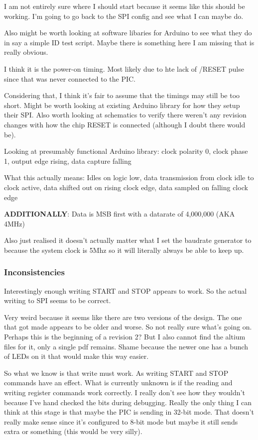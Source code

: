 I am not entirely sure where I should start because it seems like this should be working.
I'm going to go back to the SPI config and see what I can maybe do.

Also might be worth looking at software libaries for Arduino to see what they do in say
a simple ID test script.
Maybe there is something here I am missing that is really obvious.

I think it is the power-on timing. Most likely due to hte lack of /RESET pulse since
that was never connected to the PIC.

Considering that, I think it's fair to assume that the timings may still be too short.
Might be worth looking at existing Arduino library for how they setup their SPI.
Also worth looking at schematics to verify there weren't any revision changes with how
the chip RESET is connected (although I doubt there would be).

Looking at presumably functional Arduino library:
clock polarity 0, clock phase 1, output edge rising, data capture falling

What this actually means:
Idles on logic low, data transmission from clock idle to clock active,
data shifted out on rising clock edge, data sampled on falling clock edge

\textbf{ADDITIONALLY}: Data is MSB first with a datarate of 4,000,000 (AKA 4MHz)

Also just realised it doesn't actually matter what I set the baudrate generator to because
the system clock is 5Mhz so it will literally always be able to keep up.


\subsubsection{Inconsistencies}
Interestingly enough writing START and STOP appears to work.
So the actual writing to SPI seems to be correct.

Very weird because it seems like there are two versions of the design.
The one that got made appears to be older and worse. So not really sure what's going on.
Perhaps this is the beginning of a revision 2?
But I also cannot find the altium files for it, only a single pdf remains.
Shame because the newer one has a bunch of LEDs on it that would make this way easier.

So what we know is that write must work. As writing START and STOP commands have
an effect.
What is currently unknown is if the reading and writing register commands work correctly.
I really don't see how they wouldn't because I've hand checked the bits during debugging.
Really the only thing I can think at this stage is that maybe the PIC is sending in 32-bit
mode. That doesn't really make sense since it's configured to 8-bit mode but maybe it
still sends extra or something (this would be very silly).

